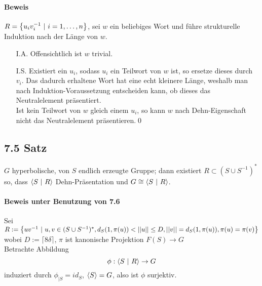 \documentclass{article}
\begin{document}
\paragraph{Beweis}
$R = \set{u_iv_i^{-1}}{i = 1,\ldots, n}$, sei $w$ ein beliebiges Wort und führe strukturelle Induktion nach der Länge von $w$.
\begin{enumerate}
	\item[I.A.] Offensichtlich ist $w$ trivial.
	\item[I.S.] Existiert ein $u_i$, sodass $u_i$ ein Teilwort von $w$ ist, so ersetze dieses durch $v_i$. Das dadurch erhaltene Wort hat eine echt kleinere Länge, weshalb man nach Induktion-Voraussetzung entscheiden kann, ob dieses das Neutralelement präsentiert.\\
	Ist kein Teilwort von $w$ gleich einem $u_i$, so kann $w$ nach Dehn-Eigenschaft nicht das Neutralelement präsentieren.\qed
\end{enumerate}

\subsection{7.5 Satz}
$G$ hyperbolische, von $S$ endlich erzeugte Gruppe; dann existiert $R \subset (S\cup S^{-1})^*$ so, dass $\grp{S}{R}$ Dehn-Präsentation und $G \cong \grp{S}{R}$.

\paragraph{Beweis unter Benutzung von 7.6}
Sei $R := \set{uv^{-1}}{u,v \in (S\cup S^{-1})^*, d_S(1, \pi(u)) < \norm{u} \leq D, \norm{v} = d_S(1, \pi(u)), \pi(u) = \pi(v) } $ wobei $D:= \lceil8\delta \rceil$, $\pi$ ist kanonische Projektion $F(S) \rightarrow G$\\ %
Betrachte Abbildung
\[\phi : \grp{S}{R} \rightarrow G \]
induziert durch $\phi_{|S} = id_{S}$, $\grp{S}{} = G$, also ist $\phi$ surjektiv.\\
\end{document}
